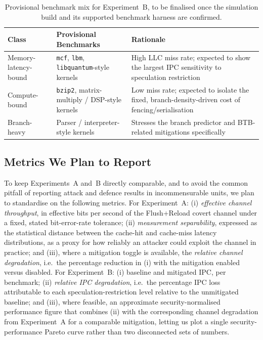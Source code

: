 \documentclass[11pt,a4paper]{article}
\begin{document}
\begin{table}[h]
\centering
\begin{tabular}{@{}p{3.4cm}p{4.4cm}p{5.4cm}@{}}
\toprule
\textbf{Class} & \textbf{Provisional Benchmarks} & \textbf{Rationale} \\
\midrule
Memory-latency-bound & \texttt{mcf}, \texttt{lbm}, \texttt{libquantum}-style kernels & High LLC miss rate; expected to show the largest IPC sensitivity to speculation restriction \\
\addlinespace
Compute-bound & \texttt{bzip2}, matrix-multiply / DSP-style kernels & Low miss rate; expected to isolate the fixed, branch-density-driven cost of fencing/serialisation \\
\addlinespace
Branch-heavy & Parser / interpreter-style kernels & Stresses the branch predictor and BTB-related mitigations specifically \\
\bottomrule
\end{tabular}
\caption{Provisional benchmark mix for Experiment~B, to be finalised once
the simulation build and its supported benchmark harness are confirmed.}
\label{tab:benchmarks}
\end{table}

\subsection{Metrics We Plan to Report}

To keep Experiments~A and~B directly comparable, and to avoid the common
pitfall of reporting attack and defence results in incommensurable units, we
plan to standardise on the following metrics. For Experiment~A: (i)
\emph{effective channel throughput}, in effective bits per second of the Flush+Reload
covert channel under a fixed, stated bit-error-rate tolerance; (ii)
\emph{measurement separability}, expressed as the statistical distance
between the cache-hit and cache-miss latency distributions, as a proxy for
how reliably an attacker could exploit the channel in practice; and (iii),
where a mitigation toggle is available, the \emph{relative channel
degradation}, i.e.\ the percentage reduction in (i) with the mitigation
enabled versus disabled. For Experiment~B: (i) baseline and mitigated IPC,
per benchmark; (ii) \emph{relative IPC degradation}, i.e.\ the percentage IPC
loss attributable to each speculation-restriction level relative to the
unmitigated baseline; and (iii), where feasible, an approximate
security-normalised performance figure that combines (ii) with the
corresponding channel degradation from Experiment~A for a comparable
mitigation, letting us plot a single security-performance Pareto curve rather
than two disconnected sets of numbers.
\end{document}
